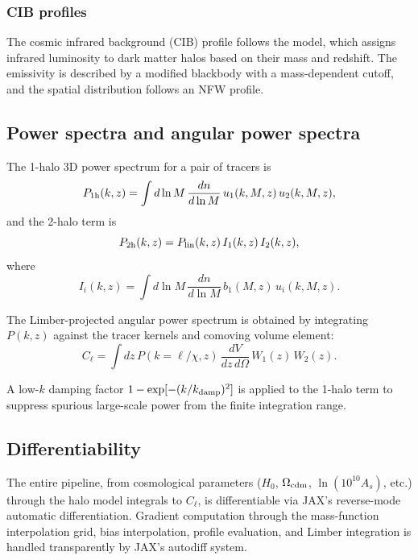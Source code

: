 \documentclass[12pt, preprint]{aastex631}
\begin{document}
\subsubsection{CIB profiles}

The cosmic infrared background (CIB) profile follows the \citet{Shang2012} model, which assigns infrared luminosity to dark matter halos based on their mass and redshift. The emissivity is described by a modified blackbody with a mass-dependent cutoff, and the spatial distribution follows an NFW profile.

\subsection{Power spectra and angular power spectra}

The 1-halo 3D power spectrum for a pair of tracers is
\begin{equation}
    P_{\rm 1h}(k,z) = \int d\ln M \, \frac{dn}{d\ln M} \, u_1(k,M,z) \, u_2(k,M,z),
\end{equation}
and the 2-halo term is
\begin{equation}
    P_{\rm 2h}(k,z) = P_{\rm lin}(k,z) \, I_1(k,z) \, I_2(k,z),
\end{equation}
where
\begin{equation}
    I_i(k,z) = \int d\ln M \, \frac{dn}{d\ln M} \, b_1(M,z) \, u_i(k,M,z).
\end{equation}

The Limber-projected angular power spectrum is obtained by integrating $P(k,z)$ against the tracer kernels and comoving volume element:
\begin{equation}
    C_\ell = \int dz \, P(k=\ell/\chi, z) \, \frac{dV}{dz\,d\Omega} \, W_1(z) \, W_2(z).
\end{equation}

A low-$k$ damping factor $1 - \exp[-(k/k_{\rm damp})^2]$ is applied to the 1-halo term to suppress spurious large-scale power from the finite integration range.

\subsection{Differentiability}

The entire pipeline, from cosmological parameters ($H_0$, $\Omega_{\rm cdm}$, $\ln(10^{10}A_s)$, etc.) through the halo model integrals to $C_\ell$, is differentiable via JAX's reverse-mode automatic differentiation. Gradient computation through the mass-function interpolation grid, bias interpolation, profile evaluation, and Limber integration is handled transparently by JAX's autodiff system.
\end{document}
